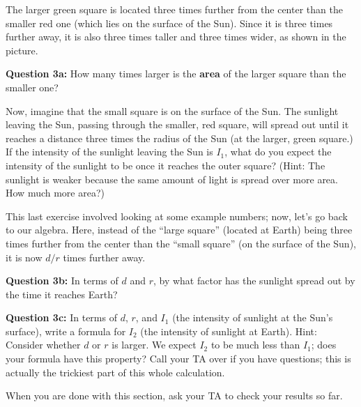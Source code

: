\documentclass[11pt]{article}
\begin{document}
The larger green square is located three times further from the center than the smaller red one (which lies on the surface of the Sun). Since it is three times further away, it is also
three times taller and three times wider, as shown in the picture.

{\bf Question 3a:} How many times larger is the {\bf area} of the larger square than the smaller one?

\vspace*{2cm}

\hrulefill
\newpage
Now, imagine that the small square is on the surface of the Sun. The sunlight leaving the Sun, passing through the smaller, red square, 
will spread out until it reaches a distance three times 
the radius of the Sun (at the larger, green square.) If the intensity of the sunlight leaving the Sun is $I_1$, what do you expect the intensity of the sunlight to be once it reaches 
the outer square? (Hint: The sunlight is weaker because the same amount of light is spread over more area. How much more area?)

\vspace*{5cm}

\hrulefill

This last exercise involved looking at some example numbers; now, let's go back to our algebra. Here, instead of the ``large square'' (located at Earth) being three times further from the 
center than the ``small square'' (on the surface of the Sun), it is now $d/r$ times further away.


{\bf Question 3b:} In terms of $d$ and $r$, by what factor has the sunlight spread out by the time it reaches Earth?

\vspace*{5cm}

\hrulefill
\newpage
{\bf Question 3c:} In terms of $d$, $r$, and $I_1$ (the intensity of sunlight at the Sun's surface), write a formula for $I_2$ (the intensity of sunlight at Earth). 
Hint: Consider whether $d$ or $r$ is larger.
We expect $I_2$ to be much less than $I_1$; does your formula have this property? Call your TA over if you have questions; this is actually the trickiest part of this whole calculation.

\vspace*{5cm}

\hrulefill

When you are done with this section, ask your TA to check your results so far.

\newpage
\end{document}
